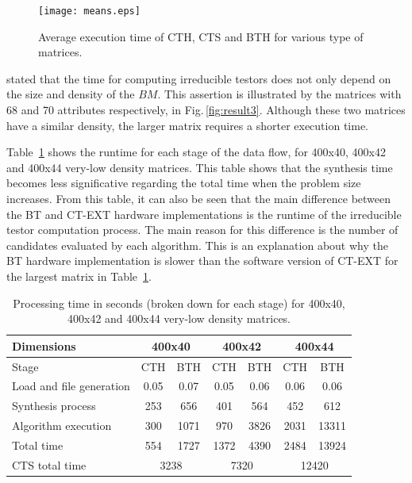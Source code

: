 \documentclass[authoryear,preprint,review,12pt]{elsarticle}
\begin{document}
\begin{figure}[htb]
    \begin{center}
       \texttt{[image: means.eps]}
    \end{center}
\caption{Average execution time of CTH, CTS and BTH for various type of matrices.}
\label{fig:means}
\end{figure}

\cite{R21} stated that the time for computing irreducible testors does not only depend on the size and 
density of the $BM$. This assertion is illustrated by the matrices with 68 and 70 attributes respectively, 
in Fig.\,\ref{fig:result3}. Although these two matrices have a similar density, the larger matrix requires
a shorter execution time.

Table~\ref{table:8} shows the runtime for each stage of the data flow, for 
400x40, 400x42 and 400x44 very-low density matrices. This table shows that the synthesis time 
becomes less significative regarding the total time when the problem size increases. 
From this table, it can also be seen that the main difference between the BT and CT-EXT hardware 
implementations is the runtime of the irreducible testor computation process. The main reason for 
this difference is the number of candidates evaluated by each algorithm. This is an explanation 
about why the BT hardware implementation is slower than the software version of CT-EXT for the 
largest matrix in Table~\ref{table:8}.


\begin{table}[htb]
\caption{Processing time in seconds (broken down for each stage) for 
400x40, 400x42 and 400x44 very-low density matrices.} \label{table:8}
\begin{center}
    \begin{tabular}{lcccccc}   \hline
    	   Dimensions                & \multicolumn{2}{c}{400x40} & \multicolumn{2}{c}{400x42} 
    	                             & \multicolumn{2}{c}{400x44} \\ \hline
    	    	Stage	        			& CTH & BTH	& CTH & BTH & CTH & BTH \\ \hline
    	    Load and file generation & 0.05& 0.07& 0.05& 0.06& 0.06& 0.06\\
    	    Synthesis process        & 253 & 656 & 401 & 564 & 452 & 612\\
    	    Algorithm execution      & 300 & 1071& 970 & 3826& 2031& 13311\\ \hline
    	    Total time               & 554 & 1727& 1372& 4390& 2484& 13924\\ \hline
    	    CTS total time               & \multicolumn{2}{c}{3238} & \multicolumn{2}{c}{7320} 
    	    								& \multicolumn{2}{c}{12420}\\ \hline
    	    
    \end{tabular}
\end{center}
\end{table}
\end{document}
